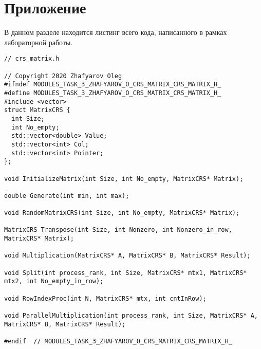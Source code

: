 \documentclass{report}
\begin{document}
\section*{Приложение}
В данном разделе находится листинг всего кода, написанного в рамках лабораторной работы.
\begin{lstlisting}
// crs_matrix.h

// Copyright 2020 Zhafyarov Oleg
#ifndef MODULES_TASK_3_ZHAFYAROV_O_CRS_MATRIX_CRS_MATRIX_H_
#define MODULES_TASK_3_ZHAFYAROV_O_CRS_MATRIX_CRS_MATRIX_H_
#include <vector>
struct MatrixCRS {
  int Size;
  int No_empty;
  std::vector<double> Value;
  std::vector<int> Col;
  std::vector<int> Pointer;
};

void InitializeMatrix(int Size, int No_empty, MatrixCRS* Matrix);

double Generate(int min, int max);

void RandomMatrixCRS(int Size, int No_empty, MatrixCRS* Matrix);

MatrixCRS Transpose(int Size, int Nonzero, int Nonzero_in_row, MatrixCRS* Matrix);

void Multiplication(MatrixCRS* A, MatrixCRS* B, MatrixCRS* Result);

void Split(int process_rank, int Size, MatrixCRS* mtx1, MatrixCRS* mtx2, int No_empty_in_row);

void RowIndexProc(int N, MatrixCRS* mtx, int cntInRow);

void ParallelMultiplication(int process_rank, int Size, MatrixCRS* A, MatrixCRS* B, MatrixCRS* Result);

#endif  // MODULES_TASK_3_ZHAFYAROV_O_CRS_MATRIX_CRS_MATRIX_H_
\end{lstlisting}
\end{document}
